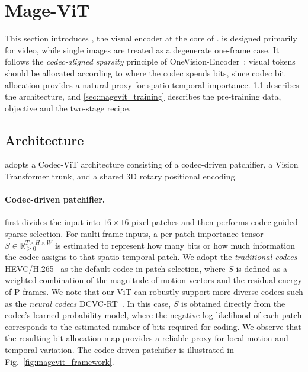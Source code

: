 \section{Mage-ViT}
\label{sec:magevit}


This section introduces \magevit, the visual encoder at the core of \magevl. \magevit is designed primarily for video, while single images are treated as a degenerate one-frame case. It follows the \emph{codec-aligned sparsity} principle of OneVision-Encoder~\citep{ovencoder2026}: visual tokens should be allocated according to where the codec spends bits, since codec bit allocation provides a natural proxy for spatio-temporal importance. \cref{sec:magevit_arch} describes the architecture, and \cref{sec:magevit_training} describes the pre-training data, objective and the two-stage recipe.



\subsection{Architecture}
\label{sec:magevit_arch}

\magevit adopts a Codec-ViT architecture consisting of a codec-driven
patchifier, a Vision Transformer trunk, and a shared 3D rotary
positional encoding.

\paragraph{Codec-driven patchifier.} \magevit first divides the input into $16{\times}16$ pixel patches and then performs codec-guided sparse selection. 
For multi-frame inputs, a per-patch importance tensor $S \in \mathbb{R}^{T\times H\times W}_{\geq 0}$ is estimated to represent how many bits or how much information the codec assigns to that spatio-temporal patch. We adopt the \emph{traditional codecs} HEVC/H.265~\citep{sullivan2012hevc} as the default codec in patch selection, where $S$ is defined as a weighted combination of the magnitude of motion vectors and the residual energy of P-frames. We note that our ViT can robustly support more diverse codecs such as the \emph{neural codecs} DCVC-RT~\citep{jia2025towards}. In this case, $S$ is obtained directly from the codec's learned probability model, where the negative log-likelihood of each patch corresponds to the estimated number of bits required for coding. We observe that the resulting bit-allocation map provides a reliable proxy for local motion and temporal variation. The codec-driven patchifier is illustrated in Fig.~\ref{fig:magevit_framework}.

